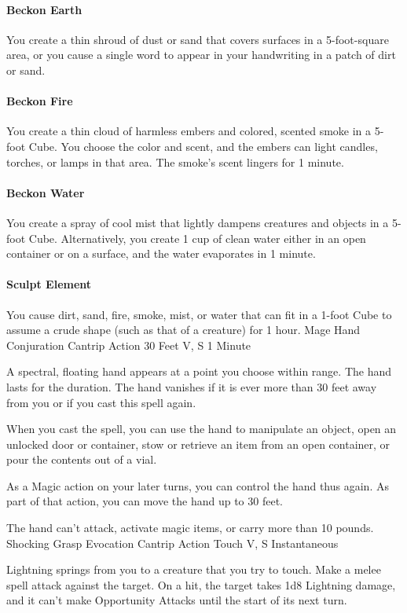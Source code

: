 \documentclass[letterpaper,openany,oneside,twocolumn]{book}
\begin{document}
\paragraph{Beckon Earth} You create a thin shroud of dust or sand that covers surfaces in a 5-foot-square area, or you cause a single word to appear in your handwriting in a patch of dirt or sand.
\paragraph{Beckon Fire} You create a thin cloud of harmless embers and colored, scented smoke in a 5-foot Cube. You choose the color and scent, and the embers can light candles, torches, or lamps in that area. The smoke's scent lingers for 1 minute.
\paragraph{Beckon Water} You create a spray of cool mist that lightly dampens creatures and objects in a 5-foot Cube. Alternatively, you create 1 cup of clean water either in an open container or on a surface, and the water evaporates in 1 minute.
\paragraph{Sculpt Element} You cause dirt, sand, fire, smoke, mist, or water that can fit in a 1-foot Cube to assume a crude shape (such as that of a creature) for 1 hour.
\DndSpellHeader
  {Mage Hand}
  {Conjuration Cantrip}
  {Action}
  {30 Feet}
  {V, S}
  {1 Minute}

A spectral, floating hand appears at a point you choose within range. The hand lasts for the duration. The hand vanishes if it is ever more than 30 feet away from you or if you cast this spell again.

When you cast the spell, you can use the hand to manipulate an object, open an unlocked door or container, stow or retrieve an item from an open container, or pour the contents out of a vial.

As a Magic action on your later turns, you can control the hand thus again. As part of that action, you can move the hand up to 30 feet.

The hand can't attack, activate magic items, or carry more than 10 pounds.
\DndSpellHeader
  {Shocking Grasp}
  {Evocation Cantrip}
  {Action}
  {Touch}
  {V, S}
  {Instantaneous}

Lightning springs from you to a creature that you try to touch. Make a melee spell attack against the target. On a hit, the target takes 1d8 Lightning damage, and it can't make Opportunity Attacks until the start of its next turn.
\end{document}
